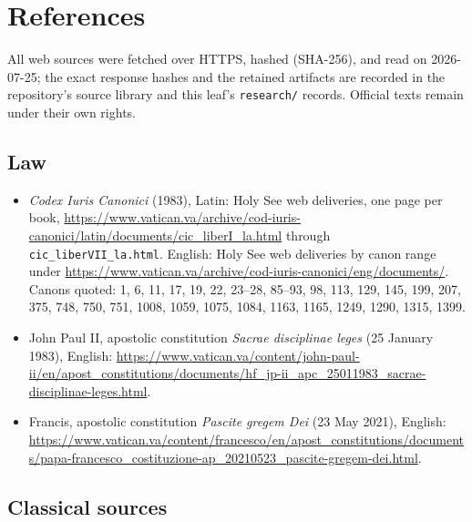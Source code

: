 \section{References}
\begingroup
\RaggedRight
All web sources were fetched over HTTPS, hashed (SHA-256), and read on 2026-07-25; the exact response hashes and the retained artifacts are recorded in the repository's source library and this leaf's \texttt{research/} records. Official texts remain under their own rights.

\subsection*{Law}

\begin{itemize}
\item \emph{Codex Iuris Canonici} (1983), Latin: Holy See web deliveries, one page per book, \url{https://www.vatican.va/archive/cod-iuris-canonici/latin/documents/cic_liberI_la.html} through \texttt{cic\_liberVII\_la.html}. English: Holy See web deliveries by canon range under \url{https://www.vatican.va/archive/cod-iuris-canonici/eng/documents/}. Canons quoted: 1, 6, 11, 17, 19, 22, 23--28, 85--93, 98, 113, 129, 145, 199, 207, 375, 748, 750, 751, 1008, 1059, 1075, 1084, 1163, 1165, 1249, 1290, 1315, 1399.
\item John Paul II, apostolic constitution \emph{Sacrae disciplinae leges} (25 January 1983), English: \url{https://www.vatican.va/content/john-paul-ii/en/apost_constitutions/documents/hf_jp-ii_apc_25011983_sacrae-disciplinae-leges.html}.
\item Francis, apostolic constitution \emph{Pascite gregem Dei} (23 May 2021), English: \url{https://www.vatican.va/content/francesco/en/apost_constitutions/documents/papa-francesco_costituzione-ap_20210523_pascite-gregem-dei.html}.
\end{itemize}

\subsection*{Classical sources}

